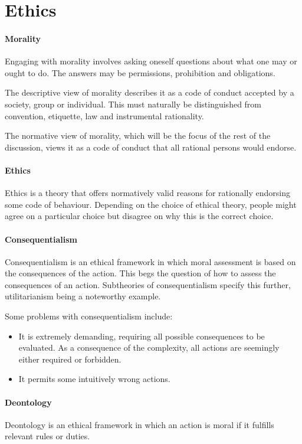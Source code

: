 \section{Ethics}

\paragraph{Morality}
Engaging with morality involves asking oneself questions about what one may or ought to do. The answers may be permissions, prohibition and obligations.

The descriptive view of morality describes it as a code of conduct accepted by a society, group or individual. This must naturally be distinguished from convention, etiquette, law and instrumental rationality.

The normative view of morality, which will be the focus of the rest of the discussion, views it as a code of conduct that all rational persons would endorse.

\paragraph{Ethics}
Ethics is a theory that offers normatively valid reasons for rationally endorsing some code of behaviour. Depending on the choice of ethical theory, people might agree on a particular choice but disagree on why this is the correct choice.

\paragraph{Consequentialism}
Consequentialism is an ethical framework in which moral assessment is based on the consequences of the action. This begs the question of how to assess the consequences of an action. Subtheories of consequentialism specify this further, utilitarianism being a noteworthy example.

Some problems with consequentialism include:
\begin{itemize}
	\item It is extremely demanding, requiring all possible consequences to be evaluated. As a consequence of the complexity, all actions are seemingly either required or forbidden.
	\item It permits some intuitively wrong actions.
\end{itemize}

\paragraph{Deontology}
Deontology is an ethical framework in which an action is moral if it fulfills relevant rules or duties.

